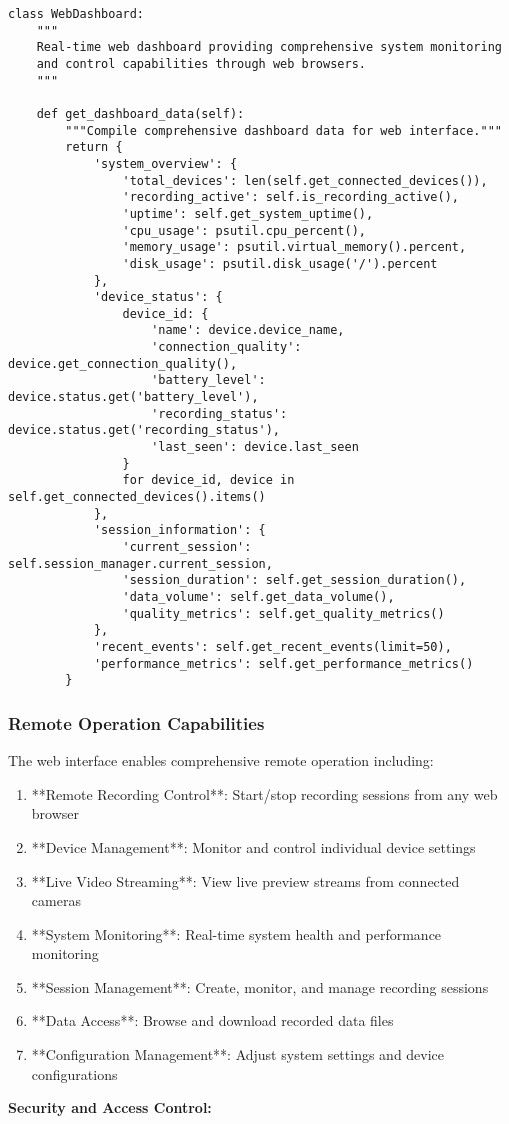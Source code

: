 \documentclass[12pt,a4paper]{article}
\begin{document}
\begin{verbatim}
class WebDashboard:
    """
    Real-time web dashboard providing comprehensive system monitoring
    and control capabilities through web browsers.
    """

    def get_dashboard_data(self):
        """Compile comprehensive dashboard data for web interface."""
        return {
            'system_overview': {
                'total_devices': len(self.get_connected_devices()),
                'recording_active': self.is_recording_active(),
                'uptime': self.get_system_uptime(),
                'cpu_usage': psutil.cpu_percent(),
                'memory_usage': psutil.virtual_memory().percent,
                'disk_usage': psutil.disk_usage('/').percent
            },
            'device_status': {
                device_id: {
                    'name': device.device_name,
                    'connection_quality': device.get_connection_quality(),
                    'battery_level': device.status.get('battery_level'),
                    'recording_status': device.status.get('recording_status'),
                    'last_seen': device.last_seen
                }
                for device_id, device in self.get_connected_devices().items()
            },
            'session_information': {
                'current_session': self.session_manager.current_session,
                'session_duration': self.get_session_duration(),
                'data_volume': self.get_data_volume(),
                'quality_metrics': self.get_quality_metrics()
            },
            'recent_events': self.get_recent_events(limit=50),
            'performance_metrics': self.get_performance_metrics()
        }
\end{verbatim}

\subsubsection{Remote Operation Capabilities}

The web interface enables comprehensive remote operation including:

\begin{enumerate}
\item **Remote Recording Control**: Start/stop recording sessions from any web browser
\item **Device Management**: Monitor and control individual device settings
\item **Live Video Streaming**: View live preview streams from connected cameras
\item **System Monitoring**: Real-time system health and performance monitoring
\item **Session Management**: Create, monitor, and manage recording sessions
\item **Data Access**: Browse and download recorded data files
\item **Configuration Management**: Adjust system settings and device configurations

\end{enumerate}
\textbf{Security and Access Control:}
\end{document}
